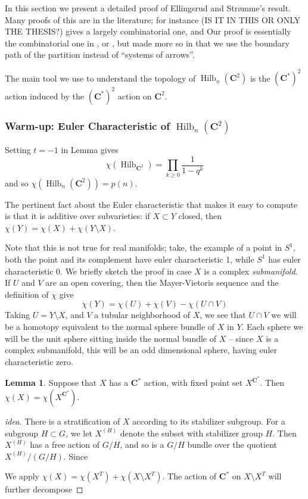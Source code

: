 \documentclass{amsart}[12pt]
\theoremstyle{definition}
\newtheorem{lemma}[dummy]{Lemma}
\newcommand{\C}{\mathbf{C}}
\DeclareMathOperator{\Hilb}{Hilb}
\begin{document}
In this section we present a detailed proof of Ellingsrud and Str\o mme's result.  Many proofs of this are in the literature; for instance \cite{cheah} (IS IT IN THIS OR ONLY THE THESIS?) gives a largely combinatorial one, and \cite{nakajimabook}   Our proof is essentially the combinatorial one in \cite{cheah}, or , but made more so in that we use the boundary path of the partition instead of ``systems of arrows''.  

The main tool we use to understand the topology of $\Hilb_n(\C^2)$ is the $(\C^*)^2$ action induced by the $(\C^*)^2$ action on $\C^2$.  




\subsubsection{Warm-up: Euler Characteristic of $\Hilb_n(\C^2)$}

Setting $t=-1$ in Lemma  gives
$$\chi(\Hilb_{\C^2})=\prod_{k\geq 0} \frac{1}{1-q^k}$$
and so $\chi(\Hilb_n(\C^2))=p(n)$.

The pertinent fact about the Euler characteristic that makes it easy to compute is that it is additive over subvarieties: if $X\subset Y$ closed, then $\chi(Y)=\chi(X)+\chi(Y\setminus X)$.

Note that this is not true for real manifolds; take, the example of a point in $S^1$, both the point and its complement have euler characteristic 1, while $S^1$ has euler characteristic 0.  We briefly sketch the proof in case $X$ is a complex \emph{submanifold}.  If $U$ and $V$ are an open covering, then the Mayer-Vietoris sequence and the definition of $\chi$ give
$$\chi(Y)=\chi(U)+\chi(V)-\chi(U\cap V)$$
Taking $U=Y\setminus X$, and $V$ a tubular neighborhood of $X$, we see that $U\cap V$ we will be a homotopy equivalent to the normal sphere bundle of $X$ in $Y$.  Each sphere we will be the unit sphere sitting inside the normal bundle of $X$ -- since $X$ is a complex submanifold, this will be an odd dimensional sphere, having euler characteristic zero.  

\begin{lemma}
Suppose that $X$ has a $\C^*$ action, with fixed point set $X^{\C^*}$.  Then $\chi(X)=\chi(X^{\C^*})$.
\end{lemma}

\begin{proof}[idea]
There is a stratification of $X$ according to its stabilizer subgroup.  For a subgroup $H\subset G$, we let $X^{(H)}$ denote the subset with stabilizer group $H$.  Then $X^{(H)}$ has a free action of $G/H$, and so is a $G/H$ bundle over the quotient $X^{(H)}/(G/H)$.  Since 

We apply $\chi(X)=\chi(X^T)+\chi(X\setminus X^T)$.  The action of $\C^*$ on $X\setminus X^T$ will further decompose
\end{proof}
\end{document}
